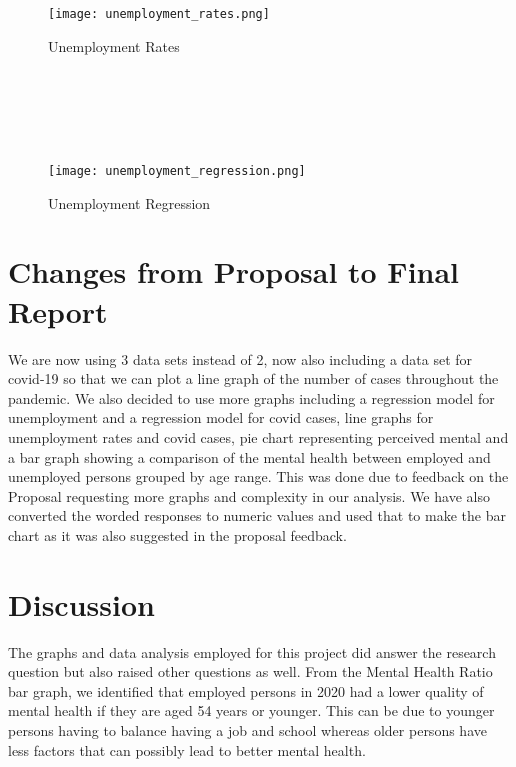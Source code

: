 \documentclass[fontsize=11pt]{article}
\begin{document}
	\phantom{---}\\
	
	\phantom{---}\\
	
	\phantom{---}\\
	
	\phantom{---}\\
	
    \begin{figure}[h]
        \texttt{[image: unemployment\_rates.png]}
        \centering
        \caption{Unemployment Rates}
        \label{fig:Figure 4}
    \end{figure}
    \phantom{---}\\

    \phantom{---}\\
    
    \phantom{---}\\
    
    \phantom{---}\\
    
    \begin{figure}[h]
        \texttt{[image: unemployment\_regression.png]}
        \centering
        \caption{Unemployment Regression}
        \label{fig:Figure 5}
    \end{figure}
    \newpage
    \phantom{---}
   
    
    
    

    \section*{Changes from Proposal to Final Report}
    We are now using 3 data sets instead of 2, now also including a data set for covid-19 so that we can plot a line graph of the number of cases throughout the pandemic. We also decided to use more graphs including a regression model for unemployment and a regression model for covid cases, line graphs for unemployment rates and covid cases, pie chart representing perceived mental and a bar graph showing a comparison of the mental health between employed and unemployed persons grouped by age range. This was done due to feedback on the Proposal requesting more graphs and complexity in our analysis. We have also converted the worded responses to numeric values and used that to make the bar chart as it was also suggested in the proposal feedback.\\

    \section*{Discussion}
    The graphs and data analysis employed for this project did answer the research question but also raised other questions as well. From the Mental Health Ratio bar graph, we identified that employed persons in 2020 had a lower quality of mental health if they are aged 54 years or younger. This can be due to younger persons having to balance having a job and school whereas older persons have less factors that can possibly lead to better mental health.
\end{document}
